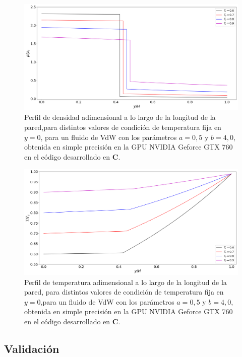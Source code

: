 \begin{figure}[h!]
	\centering
	\includegraphics[width=\textwidth]{figs/cap4/VdW_val_rho_y}
	\caption{Perfil de densidad adimensional a lo largo de la longitud de la pared,para distintos valores de condición de temperatura fija en $y = 0$, para un fluido de VdW con los parámetros $a = 0,5 $ y $b = 4,0 $, obtenida en simple precisión en la GPU NVIDIA Geforce GTX 760 en el código desarrollado en \textbf{C}.} 
	\label{fig:VdW_val_rho_y}	
\end{figure}

\begin{figure}[h!]
	\centering
	\includegraphics[width=\textwidth]{figs/cap4/VdW_val_T_y}
	\caption{Perfil de temperatura adimensional a lo largo de la longitud de la pared, para distintos valores de condición de temperatura fija en $y = 0$,para un fluido de VdW con los parámetros $a = 0,5 $ y $b = 4,0 $, obtenida en simple precisión en la GPU NVIDIA Geforce GTX 760 en el código desarrollado en \textbf{C}.} 
	\label{fig:VdW_val_T_y}	
\end{figure}

\newpage

\subsection{Validación}

